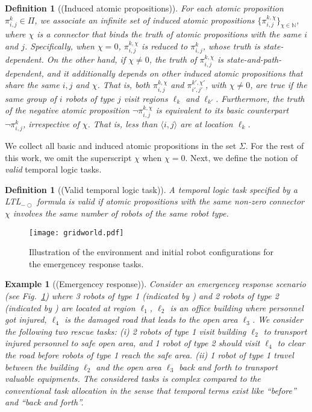 \documentclass[Afour,sageh,times]{sagej}
\newtheorem{exmp}{Example}
\newtheorem{defn}[thm]{Definition}
\newcommand{\ltl}{ {\it LTL}$_{-\bigcirc}$ }
\newcommand{\ag}[2]{\langle#1,#2\rangle}
\renewcommand{\ap}[3]{\mathcal{\pi}_{{#1},{#2}}^{#3}}
\newlength\myheight
\newlength\mydepth
\newcommand*\inlinegraphics[1]{%
  \settototalheight\myheight{Xygp}%
  \settodepth\mydepth{Xygp}%
  \raisebox{-0.7\mydepth}{\texttt{[image: \#1]}}%
}
\begin{document}
\begin{defn}[(Induced atomic propositions)]
   For each atomic proposition $\ap{i}{j}{k} \in \Pi$, we associate an infinite set of  {induced} atomic propositions $\{\ap{i}{j}{k,\chi}\}_{\chi\in \mathbb{N}}$, where $\chi$ is a {\it connector} that binds the truth of  atomic propositions with the same $i$ and $j$. Specifically, when $\chi=0$, $\ap{i}{j}{k,\chi}$ is reduced to $\ap{i}{j}{k}$, whose truth is state-dependent. On the other hand, if $\chi \neq 0$, the truth of $\ap{i}{j}{k,\chi}$ is state-and-path-dependent, and it additionally depends on other induced atomic propositions that share the same $i,j$ and $\chi$. That is, both $\ap{i}{j}{k,\chi}$ and $\ap{i'}{j'}{k',\chi'}$, with $\chi\not=0$, are true if the same group of $i$ robots of type $j$ visit regions $\ell_k$ and $\ell_{k'}$. Furthermore, the truth of the negative atomic proposition  $\neg \ap{i}{j}{k,\chi}$ is equivalent to its basic counterpart $\neg \ap{i}{j}{k}$, irrespective of  $\chi$. That is, less than $\ag{i}{j}$ are at location $\ell_k$.
 \end{defn}

We collect all basic and induced atomic propositions in the set $\Sigma$.  For the rest of this work, we omit the superscript $\chi$ when $\chi=0$. Next, we define the notion of {\it valid} temporal logic tasks.
 \begin{defn}[(Valid temporal logic task)]\label{defn:valid}
A temporal logic task specified by a\ltl formula is valid if atomic propositions with the same non-zero connector $\chi$ involves the same number of robots of the same robot type.
 \end{defn}

 \begin{figure}[!t]
    \centering
    \texttt{[image: gridworld.pdf]}
    \caption{Illustration of the environment and initial robot configurations for the emergencey response tasks.}\label{fig:workspace}
\end{figure}
\begin{exmp}[(Emergencey response)]\label{exmp:1}
  Consider an emergencey response scenario (see Fig.~\ref{fig:workspace}) where 3 robots of type 1 (indicated by \inlinegraphics{star.pdf}) and 2 robots of type 2 (indicated by \inlinegraphics{bluedot.pdf}) are located at region $\ell_1$, $\ell_2$ is an office building where personnel got injured, $\ell_4$ is the damaged road that leads to the open area $\ell_3$. We consider the following two rescue tasks: {\it (i)} \label{task:i} 2 robots of type 1 visit building $\ell_2$ to transport injured personnel to safe open area, and 1 robot of type 2 should visit $\ell_4$ to clear the road before robots of type 1 reach the safe area. {\it (ii)} \label{task:ii} 1 robot of type 1 travel between the building $\ell_2$ and the open area $\ell_3$ back and forth to transport valuable equipments. The considered tasks is complex compared to the conventional task allocation  in the sense that temporal terms exist like ``before'' and ``back and forth''.
\end{exmp}
\end{document}
